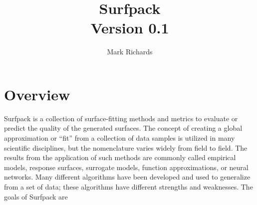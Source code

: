 \documentclass{article}
\begin{document}
\title{Surfpack\\
  Version 0.1}

\author{Mark Richards}

\maketitle

\pagebreak

\section {Overview}\label{sec:overview}
Surfpack is a collection of surface-fitting methods and metrics to evaluate or predict the quality of the generated surfaces.  The concept of creating a global approximation or ``fit'' from a collection of data samples is utilized in many scientific disciplines, but the nomenclature varies widely from field to field.  The results from the application of such methods are commonly called empirical models, response surfaces, surrogate models, function approximations, or neural networks.  Many different algorithms have been developed and used to generalize from a set of data; these algorithms have different strengths and weaknesses.  The goals of Surfpack are
\end{document}
